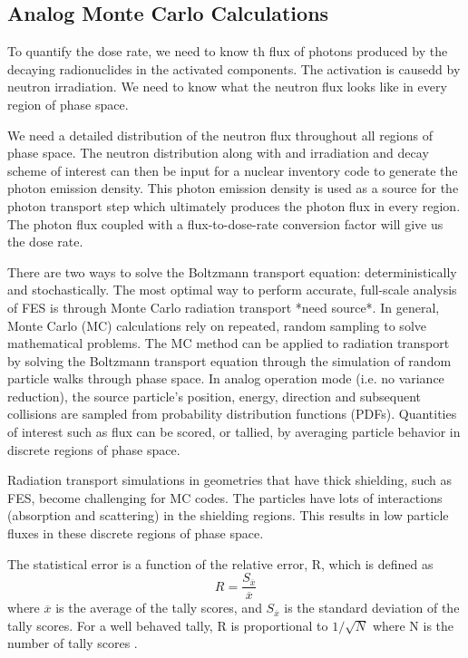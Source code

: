 
\subsection{Analog Monte Carlo Calculations}

To quantify the dose rate, we need to know th flux of photons
produced by the decaying radionuclides in the activated components. The
activation is causedd by neutron irradiation.
We need to know what the neutron flux looks like in every region of phase
space.

We need a detailed distribution of the neutron flux throughout all regions of phase
space.
The neutron distribution along with and irradiation and decay scheme of interest 
can then be input for a nuclear inventory code to generate the photon
emission density.  This photon emission density is used as a source for the
photon transport step which ultimately produces the photon flux in every region.
The photon flux coupled with a flux-to-dose-rate conversion factor will give us
the dose rate.


There are two ways to solve the Boltzmann transport equation: deterministically
and stochastically.
The most optimal way to perform accurate, full-scale analysis of FES is
through Monte Carlo radiation transport *need source*.
In general, Monte Carlo (MC) calculations rely on repeated, random sampling to solve
mathematical problems.  The MC method can be applied to radiation transport by
solving the Boltzmann transport equation through the simulation of random particle
walks through phase space.  In analog operation mode (i.e. no variance reduction), 
the source particle's position, energy, direction
and subsequent collisions are sampled from probability
distribution functions (PDFs).  Quantities of interest such as flux can be
scored, or tallied, by averaging particle behavior
in discrete regions of phase space.

Radiation transport simulations in geometries that have thick shielding, such as
FES, become challenging for MC codes.  The particles have lots of interactions
(absorption and scattering) in the shielding regions.  This results in low
particle fluxes in these discrete regions of phase space.  

The statistical error is a function of the relative error, R, which is defined as
\begin{equation} \label{eq:1.2}
		R = \frac{S_{\overline{x}}}{{\overline{x}}}
\end{equation}
where $\overline{x}$ is the average of the tally scores, and $S_{\overline{x}}$ is the standard
deviation of the tally scores.  For a well behaved tally, R is proportional
to $1/\sqrt{N}$ where N is the number of tally scores \cite{mcnp_manual}.

